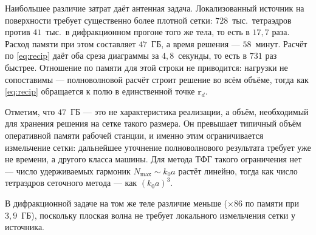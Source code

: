 \documentclass[11pt,a4paper]{article}
\begin{document}
Наибольшее различие затрат даёт антенная задача. Локализованный источник на
поверхности требует существенно более плотной сетки: $728$~тыс.\ тетраэдров против
$41$~тыс.\ в дифракционном прогоне того же тела, то есть в $17{,}7$ раза. Расход
памяти при этом составляет $47$~ГБ, а время решения --- $58$~минут. Расчёт по
\eqref{eq:recip} даёт оба среза диаграммы за $4{,}8$~секунды, то есть в $731$ раз
быстрее. Отношение по памяти для этой строки не приводится: нагрузки не
сопоставимы --- полноволновой расчёт строит решение во всём объёме, тогда как
\eqref{eq:recip} обращается к полю в единственной точке $\mathbf r_d$.

Отметим, что $47$~ГБ --- это не характеристика реализации, а объём, необходимый
для хранения решения на сетке такого размера. Он превышает типичный объём
оперативной памяти рабочей станции, и именно этим ограничивается измельчение сетки:
дальнейшее уточнение полноволнового результата требует уже не времени, а другого
класса машины. Для метода ТФГ такого ограничения нет --- число удерживаемых
гармоник $N_{\max}\sim k_0a$ растёт линейно, тогда как число тетраэдров сеточного
метода --- как $(k_0a)^3$.

В дифракционной задаче на том же теле различие меньше ($\times86$ по памяти при
$3{,}9$~ГБ), поскольку плоская волна не требует локального измельчения сетки у
источника.
\end{document}
